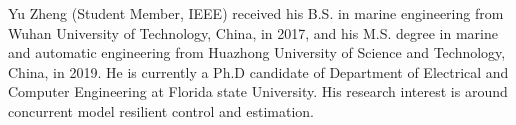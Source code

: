 \documentclass[journal]{IEEEtran}
\begin{document}
\ifCLASSOPTIONcaptionsoff
  \newpage
\fi





%
%
%



% 
\iffalse
\begin{IEEEbiography}{Yu Zheng (Student Member, IEEE)}
received his B.S. in marine engineering from Wuhan University of Technology, China, in 2017, and his M.S. degree in marine and automatic engineering from Huazhong University of Science and Technology, China, in 2019. He is currently a Ph.D candidate of Department of Electrical and Computer Engineering at Florida state University. His research interest is around concurrent model resilient control and estimation.
\end{IEEEbiography}
\end{document}
